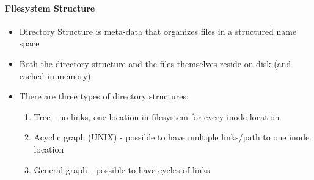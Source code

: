 \documentclass[a4paper]{article}
\begin{document}
\paragraph{Filesystem Structure}
\begin{itemize}
	\item Directory Structure is meta-data that organizes files in a structured name space
	\item Both the directory structure and the files themselves reside on disk (and cached in memory)
	\item There are three types of directory structures:
	\begin{enumerate}[label=\roman*.]
		\item Tree - no links, one location in filesystem for every inode location
		\item Acyclic graph (UNIX) - possible to have multiple links/path to one inode location
		\item General graph - possible to have cycles of links
	\end{enumerate}
\end{itemize}
\end{document}
